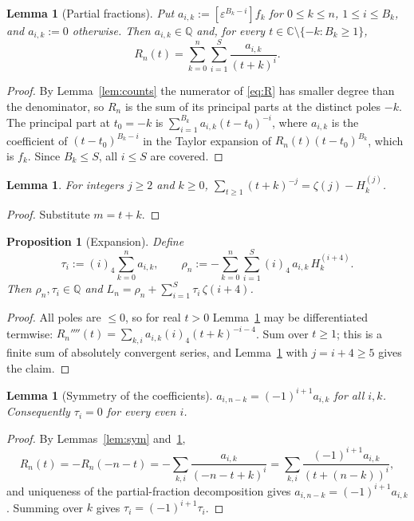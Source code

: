 \documentclass[11pt]{amsart}
\newtheorem{proposition}[theorem]{Proposition}
\newtheorem{lemma}[theorem]{Lemma}
\theoremstyle{definition}
\theoremstyle{remark}
\numberwithin{equation}{section}
\newcommand{\QQ}{\mathbb{Q}}
\newcommand{\CC}{\mathbb{C}}
\newcommand{\eps}{\varepsilon}
\begin{document}
\begin{lemma}[Partial fractions]\label{lem:pf}
Put $a_{i,k}:=[\eps^{B_k-i}]f_k$ for $0\le k\le n$, $1\le i\le B_k$, and $a_{i,k}:=0$ otherwise. Then
$a_{i,k}\in\QQ$ and, for every $t\in\CC\setminus\{-k:B_k\ge1\}$,
\[
  R_n(t)=\sum_{k=0}^{n}\sum_{i=1}^{S}\frac{a_{i,k}}{(t+k)^i}.
\]
\end{lemma}

\begin{proof}
By Lemma~\ref{lem:counts} the numerator of \eqref{eq:R} has smaller degree than the denominator, so $R_n$ is the
sum of its principal parts at the distinct poles $-k$. The principal part at $t_0=-k$ is
$\sum_{i=1}^{B_k}a_{i,k}(t-t_0)^{-i}$, where $a_{i,k}$ is the coefficient of $(t-t_0)^{B_k-i}$ in the Taylor
expansion of $R_n(t)(t-t_0)^{B_k}$, which is $f_k$. Since $B_k\le S$, all $i\le S$ are covered.
\end{proof}

\begin{lemma}\label{lem:shift}
For integers $j\ge2$ and $k\ge0$, $\sum_{t\ge1}(t+k)^{-j}=\zeta(j)-H_k^{(j)}$.
\end{lemma}

\begin{proof}
Substitute $m=t+k$.
\end{proof}

\begin{proposition}[Expansion]\label{prop:expansion}
Define
\[
  \tau_i:=(i)_4\sum_{k=0}^{n}a_{i,k},\qquad
  \rho_n:=-\sum_{k=0}^{n}\sum_{i=1}^{S}(i)_4\,a_{i,k}\,H_k^{(i+4)} .
\]
Then $\rho_n,\tau_i\in\QQ$ and $L_n=\rho_n+\sum_{i=1}^{S}\tau_i\,\zeta(i+4)$.
\end{proposition}

\begin{proof}
All poles are $\le0$, so for real $t>0$ Lemma~\ref{lem:pf} may be differentiated termwise:
$R_n''''(t)=\sum_{k,i}a_{i,k}(i)_4(t+k)^{-i-4}$. Sum over $t\ge1$; this is a finite sum of absolutely convergent
series, and Lemma~\ref{lem:shift} with $j=i+4\ge5$ gives the claim.
\end{proof}

\begin{lemma}[Symmetry of the coefficients]\label{lem:tau-even}
$a_{i,n-k}=(-1)^{i+1}a_{i,k}$ for all $i,k$. Consequently $\tau_i=0$ for every even $i$.
\end{lemma}

\begin{proof}
By Lemmas~\ref{lem:sym} and~\ref{lem:pf},
\[
  R_n(t)=-R_n(-n-t)=-\sum_{k,i}\frac{a_{i,k}}{(-n-t+k)^i}=\sum_{k,i}\frac{(-1)^{i+1}a_{i,k}}{(t+(n-k))^i},
\]
and uniqueness of the partial-fraction decomposition gives $a_{i,n-k}=(-1)^{i+1}a_{i,k}$. Summing over $k$ gives
$\tau_i=(-1)^{i+1}\tau_i$.
\end{proof}
\end{document}
